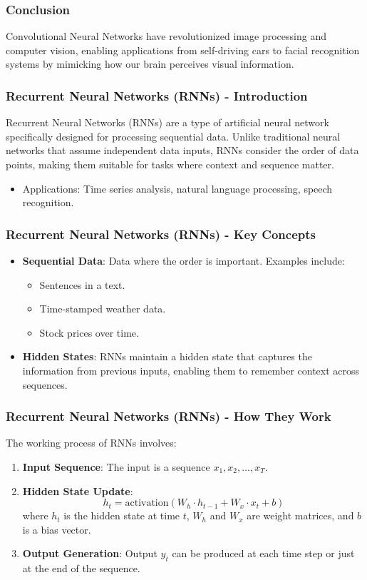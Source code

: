 \documentclass[aspectratio=169]{beamer}
\begin{document}
\begin{frame}
    \frametitle{Conclusion}
    Convolutional Neural Networks have revolutionized image processing and computer vision, enabling applications from self-driving cars to facial recognition systems by mimicking how our brain perceives visual information.
\end{frame}

\begin{frame}[fragile]
    \frametitle{Recurrent Neural Networks (RNNs) - Introduction}
    Recurrent Neural Networks (RNNs) are a type of artificial neural network specifically designed for processing sequential data. Unlike traditional neural networks that assume independent data inputs, RNNs consider the order of data points, making them suitable for tasks where context and sequence matter. 
    \begin{itemize}
        \item Applications: Time series analysis, natural language processing, speech recognition.
    \end{itemize}
\end{frame}

\begin{frame}[fragile]
    \frametitle{Recurrent Neural Networks (RNNs) - Key Concepts}
    \begin{itemize}
        \item \textbf{Sequential Data}: Data where the order is important. Examples include:
        \begin{itemize}
            \item Sentences in a text.
            \item Time-stamped weather data.
            \item Stock prices over time.
        \end{itemize}
        \item \textbf{Hidden States}: RNNs maintain a hidden state that captures the information from previous inputs, enabling them to remember context across sequences.
    \end{itemize}
\end{frame}

\begin{frame}[fragile]
    \frametitle{Recurrent Neural Networks (RNNs) - How They Work}
    The working process of RNNs involves:
    \begin{enumerate}
        \item \textbf{Input Sequence}: The input is a sequence \( x_1, x_2, \ldots, x_T \).
        \item \textbf{Hidden State Update}:
        \[
        h_t = \text{activation}(W_h \cdot h_{t-1} + W_x \cdot x_t + b)
        \]
        where \( h_t \) is the hidden state at time \( t \), \( W_h \) and \( W_x \) are weight matrices, and \( b \) is a bias vector.
        \item \textbf{Output Generation}: Output \( y_t \) can be produced at each time step or just at the end of the sequence.
    \end{enumerate}
\end{frame}
\end{document}
